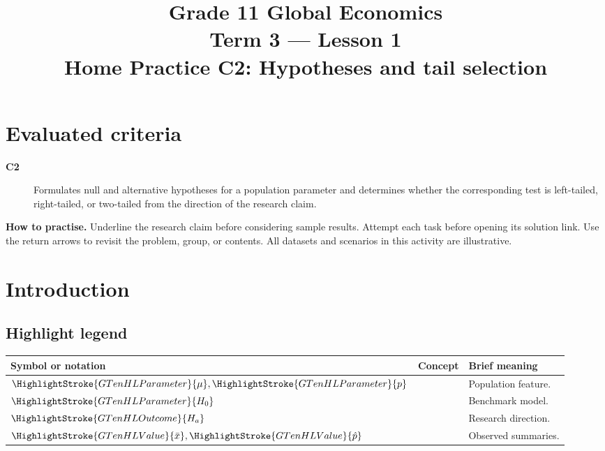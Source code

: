\makeatletter
{}
\makeatother


\newcommand{\Pop}[1]{\HighlightStroke{GTenHLParameter}{#1}}
\newcommand{\Obs}[1]{\HighlightStroke{GTenHLValue}{#1}}
\newcommand{\Design}[1]{\HighlightStroke{GTenHLThird}{#1}}
\newcommand{\Result}[1]{\HighlightStroke{GTenHLOutcome}{#1}}

\title{Grade 11 Global Economics\\Term 3 --- Lesson 1\\Home Practice C2: Hypotheses and tail selection}
\author{}\date{}

\maketitle
\setcounter{tocdepth}{1}
\setcounter{secnumdepth}{2}
\label{toc}
\tableofcontents
\section*{Evaluated criteria}
\begin{description}
\item[\textbf{C2}] Formulates null and alternative hypotheses for a population parameter and determines whether the corresponding test is left-tailed, right-tailed, or two-tailed from the direction of the research claim.
\end{description}
\textbf{How to practise.} Underline the research claim before considering sample results. Attempt each task before opening its solution link. Use the return arrows to revisit the problem, group, or contents. All datasets and scenarios in this activity are illustrative.
\clearpage
\section{Introduction}\label{sec:introduction}
\subsection*{Highlight legend}
\label{tab:highlight-legend}
\begin{tabularx}{\linewidth}{@{}>{\raggedright\arraybackslash}p{.22\linewidth}>{\raggedright\arraybackslash}p{.25\linewidth}>{\raggedright\arraybackslash}X@{}}
\toprule
\textbf{Symbol or notation}&\textbf{Concept}&\textbf{Brief meaning}\\\midrule
$\Pop{\mu},\Pop{p}$ & \Pop{Parameter} & Population feature. \\
$\Pop{H_0}$ & \Pop{Null} & Benchmark model. \\
$\Result{H_a}$ & \Result{Alternative} & Research direction. \\
$\Obs{\bar x},\Obs{\hat p}$ & \Obs{Evidence} & Observed summaries. \\
\bottomrule
\end{tabularx}
